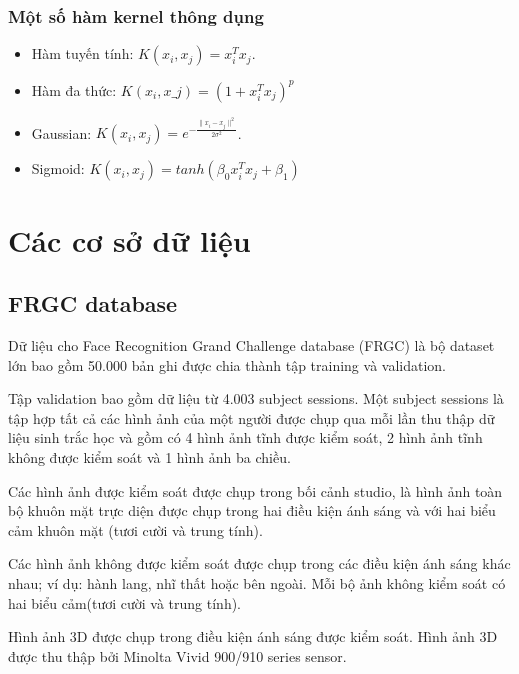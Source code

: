 \documentclass[a4paper, 12pt]{article}
\begin{document}
\subsubsection{Một số hàm kernel thông dụng}
\begin{itemize}
    \item Hàm tuyến tính: $K(x_i, x_j) = x_i^Tx_j$.
    \item Hàm đa thức: $K(x_i, x\_j) = (1 + x_i^Tx_j)^p$
    \item Gaussian: $K(x_i, x_j) = e^{-\frac{\|x_i-x_j\|^2}{2\sigma^2}}$.
    \item Sigmoid: $K(x_i, x_j) = tanh(\beta_0x_i^Tx_j + \beta_1)$
\end{itemize}

\section{Các cơ sở dữ liệu}
\subsection{FRGC database}

Dữ liệu cho Face Recognition Grand Challenge database (FRGC) là bộ dataset lớn bao gồm 50.000 bản ghi được chia thành tập training và validation.\par
Tập validation bao gồm dữ liệu từ 4.003 subject sessions. Một subject sessions là tập hợp tất cả các hình ảnh của một người được chụp qua mỗi lần thu thập dữ liệu sinh trắc học và gồm có 4 hình ảnh tĩnh được kiểm soát, 2 hình ảnh tĩnh không được kiểm soát và 1 hình ảnh ba chiều.

Các hình ảnh được kiểm soát được chụp trong bối cảnh studio, là hình ảnh toàn bộ khuôn mặt trực diện được chụp trong hai điều kiện ánh sáng và với hai biểu cảm khuôn mặt (tươi cười và trung tính).

Các hình ảnh không được kiểm soát được chụp trong các điều kiện ánh sáng khác nhau; ví dụ: hành lang, nhĩ thất hoặc bên ngoài. Mỗi bộ ảnh không kiểm soát có hai biểu cảm(tươi cười và trung tính).

Hình ảnh 3D được chụp trong điều kiện ánh sáng được kiểm soát. Hình ảnh 3D được thu thập bởi  Minolta Vivid 900/910 series sensor.
\end{document}

